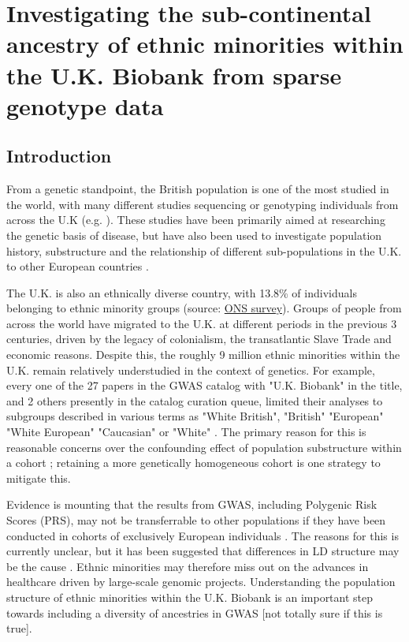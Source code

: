 \chapter{Investigating the sub-continental ancestry of ethnic minorities within the U.K. Biobank from sparse genotype data}
\label{chapterlabel3}

\section{Introduction}

From a genetic standpoint, the British population is one of the most studied in the world, with many different studies sequencing or genotyping individuals from across the U.K (e.g. \cite{bycroft2018U.K., Leslie2015, turnbull2018introducing, U.K.10k2015U.K.10k}). These studies have been primarily aimed at researching the genetic basis of disease, but have also been used to investigate population history, substructure  and the relationship of different sub-populations in the U.K. to other European countries \cite{Leslie2015, schiffels2016iron, liu2020human}.  

The U.K. is also an ethnically diverse country, with 13.8\% of individuals belonging to ethnic minority groups (source: \href{https://www.ons.gov.U.K./peoplepopulationandcommunity/populationandmigration/populationestimates/articles/researchreportonpopulationestimatesbyethnicgroupandreligion/2019-12-04}{ONS survey}). Groups of people from across the world have migrated to the U.K. at different periods in the previous 3 centuries, driven by the legacy of colonialism, the transatlantic Slave Trade and economic reasons. Despite this, the roughly 9 million ethnic minorities within the U.K. remain relatively understudied in the context of genetics. For example, every one of the 27 papers in the GWAS catalog with "U.K. Biobank" in the title, and 2 others presently in the catalog curation queue, limited their analyses to subgroups described in various terms as "White British", "British" "European" "White European" "Caucasian" or "White" \cite{manolio2019using}. The primary reason for this is reasonable concerns over the confounding effect of population substructure within a cohort \cite{hellwege2017population}; retaining a more genetically homogeneous cohort is one strategy to mitigate this. 

Evidence is mounting that the results from GWAS, including Polygenic Risk Scores (PRS), may not be transferrable to other populations if they have been conducted in cohorts of exclusively European individuals \cite{kuchenbaecker2019transferability, martin2017human, bustamante2011genomics}. The reasons for this is currently unclear, but it has been suggested that differences in LD structure may be the cause \cite{vilhjalmsson2015modeling}. Ethnic minorities may therefore miss out on the advances in healthcare driven by large-scale genomic projects. Understanding the population structure of ethnic minorities within the U.K. Biobank is an important step towards including a diversity of ancestries in GWAS [not totally sure if this is true]. 

